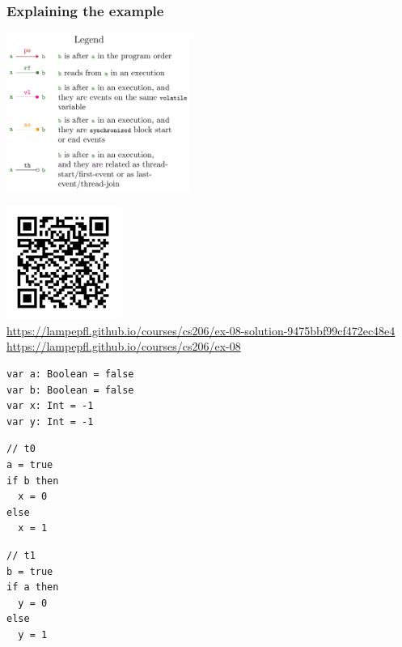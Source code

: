 \documentclass[aspectratio=1610, xcolor={dvipsnames}]{beamer}
\begin{document}
\begin{frame}
    \frametitle{Explaining the example}

    \centering

    \begin{multicols}{2}
        \includegraphics[width=0.45\textwidth]{fig/legend.jpg}
        
        \columnbreak
    
        \includegraphics[height=10em]{fig/ex_qr.png} \\

        \url{https://lampepfl.github.io/courses/cs206/ex-08-solution-9475bbf99cf472ec48e4} \\ \vspace{2em}
        \url{https://lampepfl.github.io/courses/cs206/ex-08}
    \end{multicols}

\end{frame}

\begin{frame}[fragile]

    \centering
    \begin{lstlisting}
var a: Boolean = false
var b: Boolean = false
var x: Int = -1
var y: Int = -1
    \end{lstlisting}

    \begin{multicols}{2}

        \begin{lstlisting}
// t0
a = true
if b then
  x = 0
else 
  x = 1
        \end{lstlisting}

        \columnbreak

        \begin{lstlisting}
// t1
b = true
if a then
  y = 0
else 
  y = 1
        \end{lstlisting}
        
    \end{multicols}

\end{frame}
\end{document}
